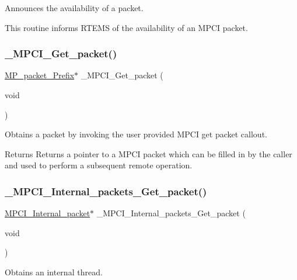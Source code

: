 Announces the availability of a packet. 

This routine informs R\+T\+E\+MS of the availability of an M\+P\+CI packet. \mbox{\label{group__RTEMSScoreMPCI_ga66e87499b1e505e2e38411619c88adce}} 
\subsubsection{\texorpdfstring{\_MPCI\_Get\_packet()}{\_MPCI\_Get\_packet()}}
{\footnotesize\ttfamily \mbox{\hyperlink{structMP__packet__Prefix}{M\+P\+\_\+packet\+\_\+\+Prefix}}$\ast$ \+\_\+\+M\+P\+C\+I\+\_\+\+Get\+\_\+packet (\begin{DoxyParamCaption}\item[{void}]{ }\end{DoxyParamCaption})}



Obtains a packet by invoking the user provided M\+P\+CI get packet callout. 

\begin{DoxyReturn}{Returns}
Returns a pointer to a M\+P\+CI packet which can be filled in by the caller and used to perform a subsequent remote operation. 
\end{DoxyReturn}
\mbox{\label{group__RTEMSScoreMPCI_gaa1dfe78c5adee4604729d791941634a6}} 
\subsubsection{\texorpdfstring{\_MPCI\_Internal\_packets\_Get\_packet()}{\_MPCI\_Internal\_packets\_Get\_packet()}}
{\footnotesize\ttfamily \mbox{\hyperlink{structMPCI__Internal__packet}{M\+P\+C\+I\+\_\+\+Internal\+\_\+packet}}$\ast$ \+\_\+\+M\+P\+C\+I\+\_\+\+Internal\+\_\+packets\+\_\+\+Get\+\_\+packet (\begin{DoxyParamCaption}\item[{void}]{ }\end{DoxyParamCaption})}



Obtains an internal thread. 

